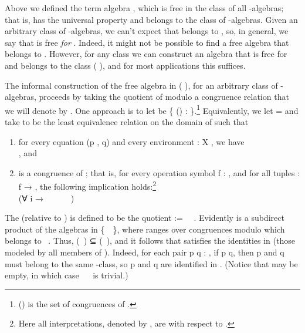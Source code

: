 Above we defined the term algebra , which is free in the class of all
-algebras; that is,  has the universal property and belongs to the class of
-algebras.  Given an arbitrary class  of -algebras, we can't expect that
 belongs to , so, in general, we say that  is free \emph{for} .
\ifshort\else
Indeed, it might not be possible to find a free algebra that belongs to .
\fi
However, for any class  we can construct an algebra that is free for 
and belongs to the class  ( ), and for most applications this suffices.

The informal construction of the free algebra in  ( ), for an arbitrary
class  of -algebras, proceeds by taking the quotient of  modulo a congruence relation
that we will denote by .  One approach is to let
 be \{   () :  \af{/}   
\}.\footnote{ () is the set of congruences of .}
Equivalently, we let  =   and take  to be the least equivalence relation
on the domain of  such that
\begin{enumerate}
\item for every equation (\ab p , \ab q)    and every
environment  : \ab X  , we have\\
      , and
\item {} is a congruence of ; that is, for every operation symbol \ab
f : , and for all tuples   :  \ab f
→ , the following implication holds:\footnote{Here all
interpretations, denoted by , are with respect to .}\\[-8pt]

(∀ i → ~~~~~~)
 ~~~~~~\\[-8pt]
\end{enumerate}
The   (relative to
) is defined to be the quotient  := ~\af{/}~.
Evidently  is a subdirect product of the algebras in \{~\af{/}~\!\},
where  ranges over congruences modulo which  belongs to ~.
Thus,   (~) ⊆ (~), and it follows
that  satisfies the identities in   (those modeled by all members of
).  Indeed, for each pair \ab p \ab q : , if   \ab p  \ab
q, then \ab p and \ab q must belong to the same -class, so \ab p and \ab q are
identified in . \ifshort\else (Notice that  may be empty, in which case
~\af{/}~ is trivial.) \fi

